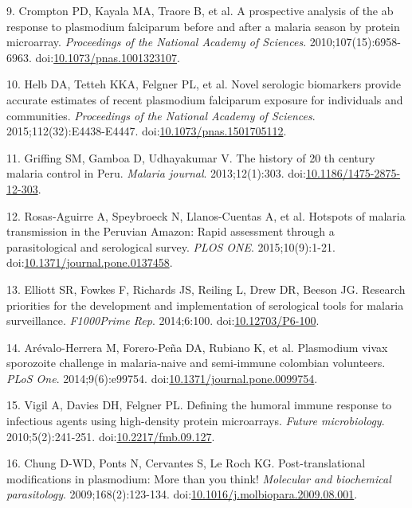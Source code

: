 \documentclass[a4paper]{article}
\begin{document}
\hypertarget{ref-crompton2010}{}
9. Crompton PD, Kayala MA, Traore B, et al. A prospective analysis of
the ab response to plasmodium falciparum before and after a malaria
season by protein microarray. \emph{Proceedings of the National Academy
of Sciences}. 2010;107(15):6958-6963.
doi:\href{https://doi.org/10.1073/pnas.1001323107}{10.1073/pnas.1001323107}.

\hypertarget{ref-Helb2015exposure}{}
10. Helb DA, Tetteh KKA, Felgner PL, et al. Novel serologic biomarkers
provide accurate estimates of recent plasmodium falciparum exposure for
individuals and communities. \emph{Proceedings of the National Academy
of Sciences}. 2015;112(32):E4438-E4447.
doi:\href{https://doi.org/10.1073/pnas.1501705112}{10.1073/pnas.1501705112}.

\hypertarget{ref-griffing2013history}{}
11. Griffing SM, Gamboa D, Udhayakumar V. The history of 20 th century
malaria control in Peru. \emph{Malaria journal}. 2013;12(1):303.
doi:\href{https://doi.org/10.1186/1475-2875-12-303}{10.1186/1475-2875-12-303}.

\hypertarget{ref-hotspots2015}{}
12. Rosas-Aguirre A, Speybroeck N, Llanos-Cuentas A, et al. Hotspots of
malaria transmission in the Peruvian Amazon: Rapid assessment through a
parasitological and serological survey. \emph{PLOS ONE}.
2015;10(9):1-21.
doi:\href{https://doi.org/10.1371/journal.pone.0137458}{10.1371/journal.pone.0137458}.

\hypertarget{ref-elliott2014}{}
13. Elliott SR, Fowkes F, Richards JS, Reiling L, Drew DR, Beeson JG.
Research priorities for the development and implementation of
serological tools for malaria surveillance. \emph{F1000Prime Rep}.
2014;6:100. doi:\href{https://doi.org/10.12703/P6-100}{10.12703/P6-100}.

\hypertarget{ref-arevalo2014}{}
14. Arévalo-Herrera M, Forero-Peña DA, Rubiano K, et al. Plasmodium
vivax sporozoite challenge in malaria-naive and semi-immune colombian
volunteers. \emph{PLoS One}. 2014;9(6):e99754.
doi:\href{https://doi.org/10.1371/journal.pone.0099754}{10.1371/journal.pone.0099754}.

\hypertarget{ref-vigil2010}{}
15. Vigil A, Davies DH, Felgner PL. Defining the humoral immune response
to infectious agents using high-density protein microarrays.
\emph{Future microbiology}. 2010;5(2):241-251.
doi:\href{https://doi.org/10.2217/fmb.09.127}{10.2217/fmb.09.127}.

\hypertarget{ref-leroch2009postmod}{}
16. Chung D-WD, Ponts N, Cervantes S, Le Roch KG. Post-translational
modifications in plasmodium: More than you think! \emph{Molecular and
biochemical parasitology}. 2009;168(2):123-134.
doi:\href{https://doi.org/10.1016/j.molbiopara.2009.08.001}{10.1016/j.molbiopara.2009.08.001}.
\end{document}
